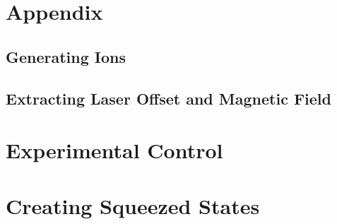 \section{Appendix}

\subsection{Generating Ions}

\subsection{Extracting Laser Offset and Magnetic Field}
\label{sec:Laser Offset}

\section{Experimental Control}
\label{sec:Experimental Control}

\section{Creating Squeezed States}
\label{sec:Squeezed States}


